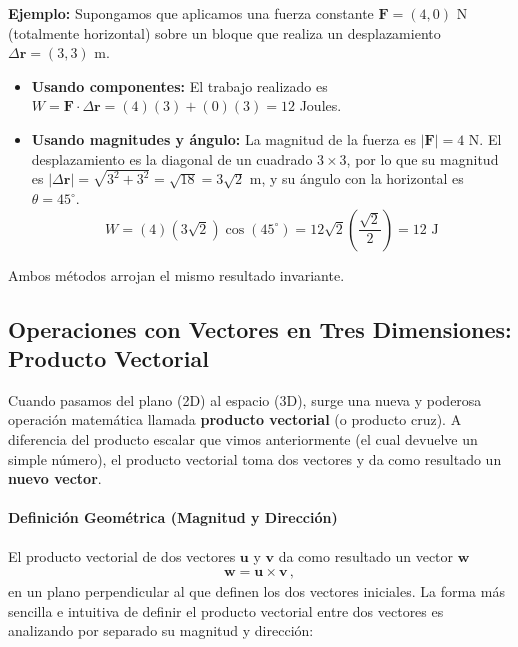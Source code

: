 \documentclass[11pt,a4paper]{book}
\begin{document}
\textbf{Ejemplo:} Supongamos que aplicamos una fuerza constante $\boldsymbol{F} = (4, 0)$ N (totalmente horizontal) sobre un bloque que realiza un desplazamiento $\Delta\boldsymbol{r} = (3, 3)$ m. 
\begin{itemize}
    \item \textbf{Usando componentes:} El trabajo realizado es $W = \boldsymbol{F} \cdot \Delta\boldsymbol{r} = (4)(3) + (0)(3) = 12$ Joules.
    \item \textbf{Usando magnitudes y ángulo:} La magnitud de la fuerza es $|\boldsymbol{F}| = 4$ N. El desplazamiento es la diagonal de un cuadrado $3 \times 3$, por lo que su magnitud es $|\Delta\boldsymbol{r}| = \sqrt{3^2 + 3^2} = \sqrt{18} = 3\sqrt{2}$ m, y su ángulo con la horizontal es $\theta = 45^\circ$.
    $$ W = (4)(3\sqrt{2})\cos(45^\circ) = 12\sqrt{2} \left(\frac{\sqrt{2}}{2}\right) = 12 \text{ J} $$
\end{itemize}
Ambos métodos arrojan el mismo resultado invariante.

\subsection{Operaciones con Vectores en Tres Dimensiones: Producto Vectorial}


Cuando pasamos del plano (2D) al espacio (3D), surge una nueva y poderosa operación matemática llamada \textbf{producto vectorial} (o producto cruz). A diferencia del producto escalar que vimos anteriormente (el cual devuelve un simple número), el producto vectorial toma dos vectores y da como resultado un \textbf{nuevo vector}.

\paragraph{Definición Geométrica (Magnitud y Dirección)}
El producto vectorial de dos vectores $\boldsymbol{u}$ y $\boldsymbol{v}$ da como resultado un vector $\boldsymbol{w}$ 
\begin{align}
\label{eq:crossproduct}
    \boldsymbol{w}=\boldsymbol{u}\times \boldsymbol{v}\,,
\end{align}
en un plano perpendicular al que definen los dos vectores iniciales.
La forma más sencilla e intuitiva de definir el producto vectorial entre dos vectores  es analizando por separado su magnitud y dirección:
\end{document}
